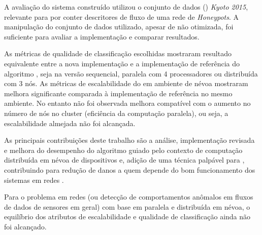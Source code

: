 A avaliação do sistema construído utilizou o conjunto de dados (\dataset)
\emph{Kyoto 2015}, relevante para \nids por conter descritores de fluxo de uma
rede de \emph{Honeypots}.
A manipulação do conjunto de dados utilizado, apesar de não otimizada, foi
suficiente para avaliar a implementação e comparar resultados.


As métricas de qualidade de classificação escolhidas mostraram resultado
equivalente entre a nova implementação e a implementação de referência do
algoritmo \minas, seja na versão sequencial, paralela com 4 processadores ou
distribuída com 3 nós.
As métricas de escalabilidade do \mfog em ambiente de névoa \iot mostraram
melhora significante comparada à implementação de referência no mesmo ambiente.
No entanto não foi observada melhora compatível com o aumento no número de nós
no cluster
(eficiência da computação paralela), ou seja, a escalabilidade
almejada não foi alcançada.

As principais contribuições deste trabalho são a análise, implementação revisada
e melhora do desempenho do algoritmo \minas guiado pelo contexto de computação
distribuída em névoa de dispositivos \iot e, adição de uma técnica palpável para
\nids, contribuindo para redução de danos a quem depende do bom funcionamento
dos sistemas em redes \iot.





Para o problema \nids em redes \iot (ou detecção de comportamentos anômalos em
fluxos de dados de sensores \iot em geral) com base em \nd paralela e
distribuída em névoa, o equilíbrio dos atributos de escalabilidade e
qualidade de classificação ainda não foi alcançado.

